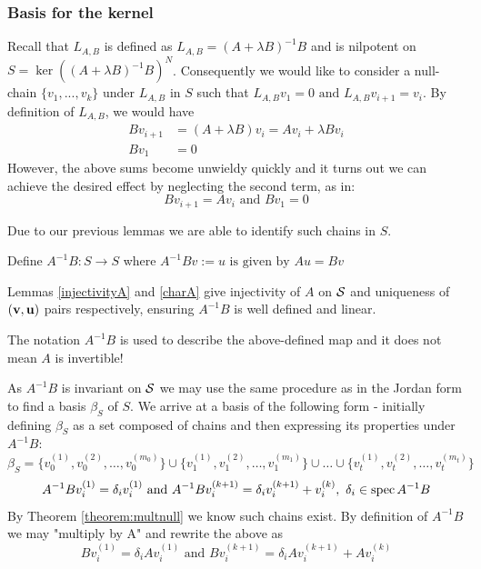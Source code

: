 \subsubsection{Basis for the kernel }\label{basisS}
Recall that $L_{A,B}$ is defined as $L_{A,B}=(A+\lambda B)^{-1}B$ and is nilpotent on
$S=\ker((A+\lambda B)^{-1}B)^N$.
Consequently we would like to consider a null-chain $\{v_1,...,v_k\}$ under $L_{A,B}$ in $S$ such that $L_{A,B}v_1=0\text{ and }  L_{A,B}v_{i+1}=v_i $. By definition of $L_{A,B}$, we would have
\begin{align*}
   Bv_{i+1}&=(A+\lambda B)v_i=Av_i+\lambda Bv_i\label{18}\\
   Bv_1&=0
\end{align*}
However, the above sums become unwieldy quickly and it turns out we can achieve the desired effect by neglecting the second term, as in:
\begin{equation}\label{chainAB}
    Bv_{i+1}=Av_i\text{ and }Bv_1=0
\end{equation}

Due to our previous lemmas we are able to identify such chains in $S$.

Define $A^{-1}B:S\rightarrow S$ where
$A^{-1}Bv:=u \text{ is given by }Au=Bv$

Lemmas \ref{injectivityA} and \ref{charA} give injectivity of \(A\) on \(\mathcal{S}\) and uniqueness of \((\mathbf{v},\mathbf{u})\) pairs respectively, ensuring \(A^{-1}B\) is well defined and linear.

\begin{remark}
    The notation $A^{-1}B$ is used to describe the above-defined map and it does not mean $A$ is invertible!
\end{remark}
\newpage
As \(A^{-1}B\) is invariant on \(\mathcal{S}\) we may use the same procedure as in the Jordan form to find a basis \(\beta_S\) of \(S\).
We arrive at a basis of the following form - initially defining $\beta_S$ as a set composed of chains and then expressing its properties under $A^{-1}B$:
\begin{equation}
\beta_S=\{v_{0}^{(1)},v_{0}^{(2)},\dots,v_{0}^{(m_0)}\} \cup \{v_{1}^{(1)},v_{1}^{(2)},\dots,v_{1}^{(m_1)}\} \cup \dots \cup \{v_{t}^{(1)},v_{t}^{(2)},\dots,v_{t}^{(m_t)}\} \tag{\(\star\)} \label{eq:vbasis}
 \end{equation}
\begin{equation}
    A^{-1}Bv_{i}^{(1)}=\delta_i v_{i}^{(1)} \text{ and } A^{-1}Bv_{i}^{(k+1)}=\delta_i v_{i}^{(k+1)}+v_{i}^{(k)}, \ \delta_i \in \spec A^{-1}B
\end{equation}
By Theorem \ref{theorem:multnull} we know such chains exist. By definition of $A^{-1}B$ we may "multiply by A" and rewrite the above as
\begin{equation}\label{BAdel0}
   Bv_{i}^{(1)}=\delta_iA v_{i}^{(1)} \text{ and } Bv_{i}^{(k+1)}=\delta_iA v_{i}^{(k+1)}+Av_{i}^{(k)}
\end{equation}

